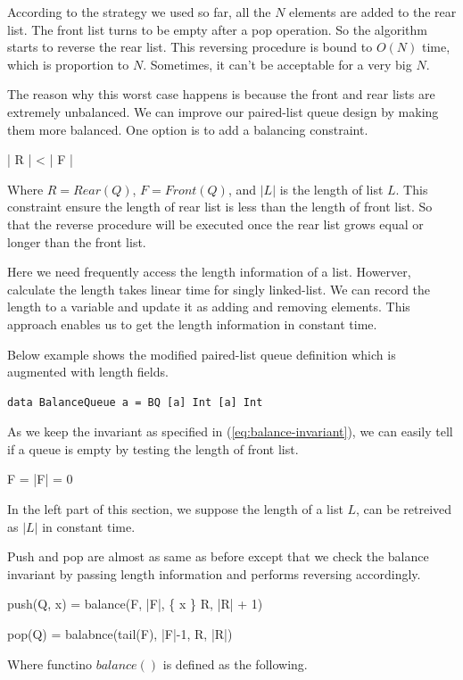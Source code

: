 \documentclass{article}
\begin{document}
According to the strategy we used so far, all the $N$ elements are added
to the rear list. The front list turns to be empty after a pop operation.
So the algorithm starts to reverse the rear list. This reversing procedure
is bound to $O(N)$ time, which is proportion to $N$. Sometimes, it can't be
acceptable for a very big $N$.

The reason why this worst case happens is because the front and rear lists
are extremely unbalanced. We can improve our paired-list queue design
by making them more balanced. One option is to add a balancing constraint.

\be
  | R | < | F |
\label{eq:balance-invariant}
\ee

Where $R = Rear(Q)$, $F = Front(Q)$, and $|L|$ is the length of list $L$. 
This constraint ensure the length
of rear list is less than the length of front list. So that the reverse
procedure will be executed once the rear list grows equal or longer than
the front list.

Here we need frequently access the length information of a list. Howerver,
calculate the length takes linear time for singly linked-list. We can 
record the length to a variable and update it as adding and removing elements.
This approach enables us to get the length information in constant time.

Below example shows the modified paired-list queue definition which is augmented 
with length fields.

\lstset{language=Haskell}
\begin{lstlisting}
data BalanceQueue a = BQ [a] Int [a] Int
\end{lstlisting}

As we keep the invariant as specified in (\ref{eq:balance-invariant}), we
can easily tell if a queue is empty by testing the length of front list.

\be
  F = \Phi \Leftrightarrow |F| = 0
\ee

In the left part of this section, we suppose the length of a list $L$, can
be retreived as $|L|$ in constant time.

Push and pop are almost as same as before except that we check the balance
invariant by passing length information and performs reversing accordingly.

\be
  push(Q, x) = balance(F, |F|, \{ x \} \cup R, |R| + 1)
\ee

\be
  pop(Q) = balabnce(tail(F), |F|-1, R, |R|)
\ee

Where functino $balance()$ is defined as the following.
\end{document}
